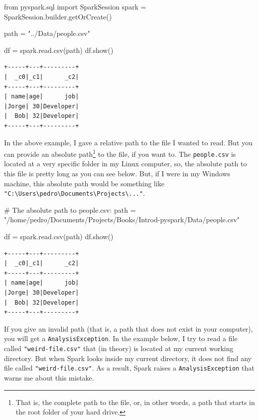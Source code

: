 \documentclass[
  11pt,
  letterpaper,
  DIV=11,
  numbers=noendperiod]{scrreprt}
\newenvironment{Shaded}{\begin{snugshade}}{\end{snugshade}}
\newcommand{\CommentTok}[1]{\textcolor[rgb]{0.37,0.37,0.37}{#1}}
\newcommand{\ImportTok}[1]{\textcolor[rgb]{0.00,0.46,0.62}{#1}}
\newcommand{\NormalTok}[1]{\textcolor[rgb]{0.00,0.23,0.31}{#1}}
\newcommand{\OperatorTok}[1]{\textcolor[rgb]{0.37,0.37,0.37}{#1}}
\newcommand{\StringTok}[1]{\textcolor[rgb]{0.13,0.47,0.30}{#1}}
\begin{document}
\begin{Shaded}
\begin{Highlighting}[]
\ImportTok{from}\NormalTok{ pyspark.sql }\ImportTok{import}\NormalTok{ SparkSession}
\NormalTok{spark }\OperatorTok{=}\NormalTok{ SparkSession.builder.getOrCreate()}

\NormalTok{path }\OperatorTok{=} \StringTok{"../Data/people.csv"}

\NormalTok{df }\OperatorTok{=}\NormalTok{ spark.read.csv(path)}
\NormalTok{df.show()}
\end{Highlighting}
\end{Shaded}

\begin{verbatim}
+-----+---+---------+
|  _c0|_c1|      _c2|
+-----+---+---------+
| name|age|      job|
|Jorge| 30|Developer|
|  Bob| 32|Developer|
+-----+---+---------+
\end{verbatim}

In the above example, I gave a relative path to the file I wanted to
read. But you can provide an absolute path\footnote{That is, the
  complete path to the file, or, in other words, a path that starts in
  the root folder of your hard drive.} to the file, if you want to. The
\texttt{people.csv} is located at a very specific folder in my Linux
computer, so, the absolute path to this file is pretty long as you can
see below. But, if I were in my Windows machine, this absolute path
would be something like
\texttt{"C:\textbackslash{}Users\textbackslash{}pedro\textbackslash{}Documents\textbackslash{}Projects\textbackslash{}..."}.

\begin{Shaded}
\begin{Highlighting}[]
\CommentTok{\# The absolute path to \textasciigrave{}people.csv\textasciigrave{}:}
\NormalTok{path }\OperatorTok{=} \StringTok{"/home/pedro/Documents/Projects/Books/Introd{-}pyspark/Data/people.csv"}

\NormalTok{df }\OperatorTok{=}\NormalTok{ spark.read.csv(path)}
\NormalTok{df.show()}
\end{Highlighting}
\end{Shaded}

\begin{verbatim}
+-----+---+---------+
|  _c0|_c1|      _c2|
+-----+---+---------+
| name|age|      job|
|Jorge| 30|Developer|
|  Bob| 32|Developer|
+-----+---+---------+
\end{verbatim}

If you give an invalid path (that is, a path that does not exist in your
computer), you will get a \texttt{AnalysisException}. In the example
below, I try to read a file called \texttt{"weird-file.csv"} that (in
theory) is located at my current working directory. But when Spark looks
inside my current directory, it does not find any file called
\texttt{"weird-file.csv"}. As a result, Spark raises a
\texttt{AnalysisException} that warns me about this mistake.
\end{document}
